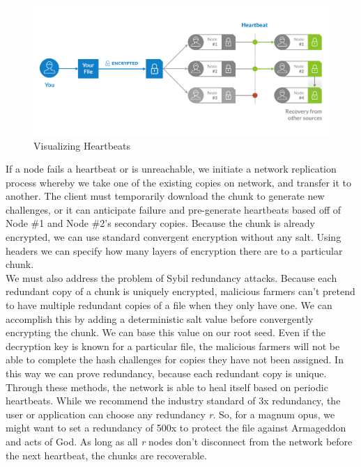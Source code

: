 \documentclass[a4paper,10pt]{article}
\begin{document}
\begin{figure}[!h]
\centering
\includegraphics[width=\linewidth]{4}
\caption{Visualizing Heartbeats}
\end{figure}

If a node fails a heartbeat or is unreachable, we initiate a network replication process whereby we take one of the existing copies on network, and transfer it to another. The client must temporarily download the chunk to generate new challenges, or it can anticipate failure and pre-generate heartbeats based off of Node \#1 and Node \#2’s secondary copies. Because the chunk is already encrypted, we can use standard convergent encryption without any salt. Using headers we can specify how many layers of encryption there are to a particular chunk. \\

We must also address the problem of Sybil redundancy attacks. Because each redundant copy of a chunk is uniquely encrypted, malicious farmers can’t pretend to have multiple redundant copies of a file when they only have one. We can accomplish this by adding a deterministic salt value before convergently encrypting the chunk. We can base this value on our root seed. Even if the decryption key is known for a particular file, the malicious farmers will not be able to complete the hash challenges for copies they have not been assigned. In this way we can prove redundancy, because each redundant copy is unique.   \\

Through these methods, the network is able to heal itself based on periodic heartbeats. While we recommend the industry standard of 3x redundancy, the user or application can choose any redundancy \textit{r}. So, for a magnum opus, we might want to set a redundancy of 500x to protect the file against Armageddon and acts of God. As long as all \textit{r} nodes don’t disconnect from the network before the next heartbeat, the chunks are recoverable. 
\end{document}
